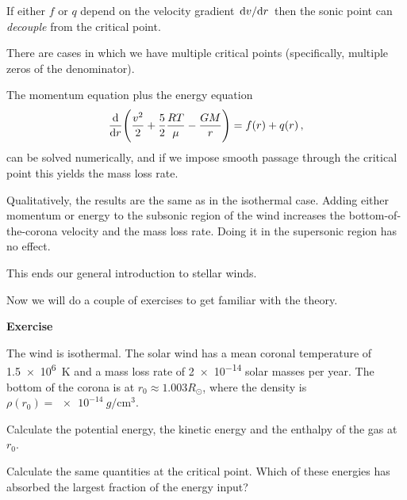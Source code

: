 \documentclass[main.tex]{subfiles}
\begin{document}
If either \(f\) or \(q\) depend on the velocity gradient \(\dv*{v}{r}\) then the sonic point can \emph{decouple} from the critical point.

There are cases in which we have multiple critical points (specifically, multiple zeros of the denominator).

The momentum equation plus the energy equation 
%
\begin{align}
  \dv{}{r} \qty(\frac{v^2}{2} + \frac{5}{2} \frac{RT}{\mu } - \frac{GM}{r}) = f(r) + q(r)
\,,
\end{align}
%
can be solved numerically, and if we impose smooth passage through the critical point this yields the mass loss rate.

Qualitatively, the results are the same as in the isothermal case.
Adding either momentum or energy to the subsonic region of the wind increases the bottom-of-the-corona velocity and the mass loss rate. Doing it in the supersonic region has no effect.

This ends our general introduction to stellar winds.

Now we will do a couple of exercises to get familiar with the theory. 

\begin{greenbox} \textbf{Exercise}

The wind is isothermal.
The solar wind has a mean coronal temperature of \SI{1.5e6}{K} and a mass loss rate of \num{2e-14} solar masses per year.
The bottom of the corona is at \(r_0 \approx 1.003 R_{\odot}\), where the density is \(\rho (r_0 ) = \SI{e-14}{g\per\centi\metre\cubed}\).

Calculate the potential energy, the kinetic energy and the enthalpy of the gas at \(r_0 \).

Calculate the same quantities at the critical point. Which of these energies has absorbed the largest fraction of the energy input?
\end{greenbox}
\end{document}
